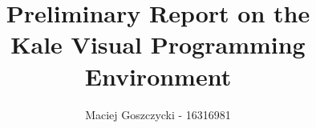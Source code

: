 \documentclass[11pt]{report}
\title{Preliminary Report on the \\ Kale Visual Programming Environment}
\author{Maciej Goszczycki - 16316981}
\date{\versionBox}
\begin{document}
\maketitle
\tableofcontents
\clearpage
{}
\setcounter{page}{1}

\setlength\intextsep{0pt}

\DefineShortVerb{\|}



















\renewcommand*{\bibfont}{\raggedright}

\clearpage


\begin{appendices}
	
	
	
\end{appendices}
\end{document}
